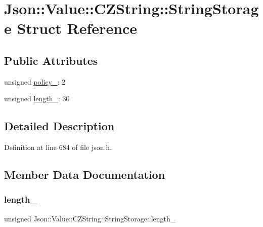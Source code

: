 \hypertarget{struct_json_1_1_value_1_1_c_z_string_1_1_string_storage}{}\section{Json\+:\+:Value\+:\+:C\+Z\+String\+:\+:String\+Storage Struct Reference}
\label{struct_json_1_1_value_1_1_c_z_string_1_1_string_storage}
\subsection*{Public Attributes}
\begin{DoxyCompactItemize}
\item 
unsigned \hyperlink{struct_json_1_1_value_1_1_c_z_string_1_1_string_storage_a7f68c8d6197c5692a525854b5f29f87b}{policy\+\_\+}\+: 2
\item 
unsigned \hyperlink{struct_json_1_1_value_1_1_c_z_string_1_1_string_storage_a165d865c44e6471d34668eeb4f15b140}{length\+\_\+}\+: 30
\end{DoxyCompactItemize}


\subsection{Detailed Description}


Definition at line 684 of file json.\+h.



\subsection{Member Data Documentation}
\hypertarget{struct_json_1_1_value_1_1_c_z_string_1_1_string_storage_a165d865c44e6471d34668eeb4f15b140}{}\label{struct_json_1_1_value_1_1_c_z_string_1_1_string_storage_a165d865c44e6471d34668eeb4f15b140} 
\subsubsection{\texorpdfstring{length\+\_\+}{length\_}}
{\footnotesize\ttfamily unsigned Json\+::\+Value\+::\+C\+Z\+String\+::\+String\+Storage\+::length\+\_\+}



